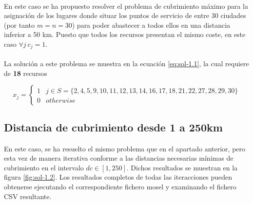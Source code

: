 \documentclass[spanish]{article}
\begin{document}
			\paragraph{}
			En este caso se ha propuesto resolver el problema de cubrimiento máximo para la asignación de los lugares donde situar los puntos de servicio de entre 30 ciudades (por tanto $m = n = 30$) para poder abastecer a todos ellos en una distancia inferior a 50 km. Puesto que todos los recursos presentan el mismo coste, en este caso $\forall j \ c_{j} = 1$.

			\paragraph{}
			La solución a este problema se muestra en la ecuación \eqref{eq:sol-1.1}, la cual requiere de \textbf{18} recursos

			\begin{equation}
			\label{eq:sol-1.1}
				x_{j} =
					\begin{cases}
		      	1 & j \in S = \{2,  4,  5,  9,  10,  11,  12,  13,  14,  16,  17,  18,  21,  22,  27,  28,  29,  30 \} \\
		      	0 & otherwise
			   	\end{cases}
			\end{equation}

		\subsection{Distancia de cubrimiento desde 1 a 250km}
		\label{sec:1.2}

			\paragraph{}
			En este caso, se ha resuelto el mismo problema que en el apartado anterior, pero esta vez de manera iterativa conforme a las distancias necesarias mínimas de cubrimiento en el intervalo $dc \in [1, 250]$. Dichos resultados se muestran en la figura \ref{fig:sol-1.2}. Los resultados completos de todas las iteracciones pueden obtenerse ejecutando el correspondiente fichero mosel\cite{garciparedes:mosel-examples} y examinando el fichero CSV resultante.
\end{document}

